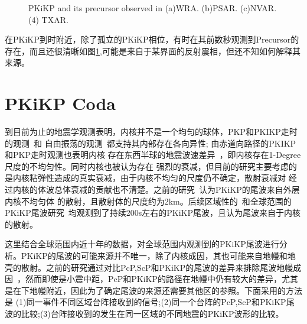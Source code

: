 \begin{figure}[!ht]
{}
	\hspace{2em}
	\caption{PKiKP and its precursor observed in (a)WRA. (b)PSAR. (c)NVAR. (4)%
TXAR.}
	\label{pre}
\end{figure}

在PKiKP到时附近，除了孤立的PKiKP相位，有时在其前数秒观测到Precursor的存在，而且还很清晰如图\ref{pre},可能是来自于某界面的反射震相，但还不知如何解释其来源。

\newpage

\section{PKiKP Coda}


到目前为止的地震学观测表明，内核并不是一个均匀的球体，PKP和PKIKP走时的观测~\citep{Creager1992}和
自由振荡的观测~\citep{Tromp1993}都支持其内部存在各向异性; 由赤道向路径的PKIKP和PKP走时观测也表明内核
存在东西半球的地震波速差异~\citep{Tanaka1997}，即内核存在1-Degree尺度的不均匀性。同时内核也被认为存在
强烈的衰减，但目前的研究主要考虑的是内核粘弹性造成的真实衰减，由于内核不均匀的尺度仍不确定，散射衰减对
经过内核的体波总体衰减的贡献也不清楚。之前的研究~\citep{Vidale2000}认为PKiKP的尾波来自外层内核不均匀体
的散射，且散射体的尺度约为2km。后续区域性的~\citep{Poupinet2004}和全球范围的PKiKP尾波研究~\citep{Koper2004}均观测到了持续200s左右的PKiKP尾波，且认为尾波来自于内核的散射。

这里结合全球范围内近十年的数据，对全球范围内观测到的PKiKP尾波进行分析。PKiKP的尾波的可能来源并不唯一，除了内核成因，其也可能来自地幔和地壳的散射。之前的研究通过对比PcP,ScP和PKiKP的尾波的差异来排除尾波地幔成因~\citep{Koper2004}，然而即使是小震中距，PcP和PKiKP的路径在地幔中仍有较大的差异，尤其是在下地幔附近，因此为了确定尾波的来源还需要其他区的参照。下面采用的方法是
(1)同一事件不同区域台阵接收到的信号;(2)同一个台阵的PcP,ScP和PKiKP尾波的比较;(3)台阵接收到的发生在同一区域的不同地震的PKiKP波形的比较。

